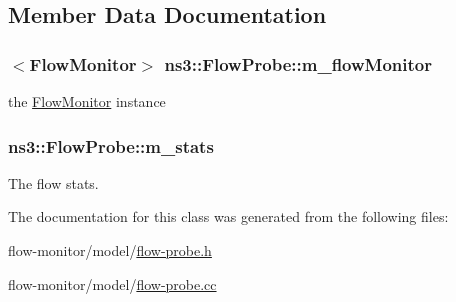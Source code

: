 \subsection{Member Data Documentation}
\subsubsection[{\texorpdfstring{m\+\_\+flow\+Monitor}{m_flowMonitor}}]{$<${\bf Flow\+Monitor}$>$ ns3\+::\+Flow\+Probe\+::m\+\_\+flow\+Monitor\hspace{0.3cm}{\ttfamily [protected]}}\hypertarget{classns3_1_1FlowProbe_adab205c7ab7cf4c65d72d030d8aaa82a}{}\label{classns3_1_1FlowProbe_adab205c7ab7cf4c65d72d030d8aaa82a}


the \hyperlink{classns3_1_1FlowMonitor}{Flow\+Monitor} instance 

\subsubsection[{\texorpdfstring{m\+\_\+stats}{m_stats}}]{ ns3\+::\+Flow\+Probe\+::m\+\_\+stats\hspace{0.3cm}{\ttfamily [protected]}}\hypertarget{classns3_1_1FlowProbe_a33e073a315870591d4c8e9a1001b2a8b}{}\label{classns3_1_1FlowProbe_a33e073a315870591d4c8e9a1001b2a8b}


The flow stats. 



The documentation for this class was generated from the following files\+:\begin{DoxyCompactItemize}
\item 
flow-\/monitor/model/\hyperlink{flow-probe_8h}{flow-\/probe.\+h}\item 
flow-\/monitor/model/\hyperlink{flow-probe_8cc}{flow-\/probe.\+cc}\end{DoxyCompactItemize}
